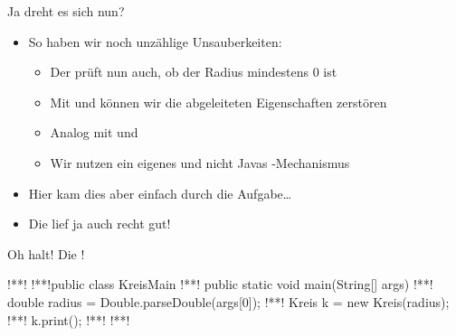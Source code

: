\iffull
\begin{frame}{Ja dreht es sich nun?}
    \begin{itemize}[<+(1)->]
        \itemsep6pt
        \item So haben wir noch unzählige Unsauberkeiten: \begin{itemize}
            \item Der  prüft nun auch, ob der Radius mindestens \(0\) ist 
            \item Mit  und  können wir die abgeleiteten Eigenschaften zerstören
            \item Analog mit  und 
            \item Wir nutzen ein eigenes  und nicht Javas -Mechanismus
        \end{itemize}
        \item Hier kam dies aber einfach durch die Aufgabe\ldots
        \item Die lief ja auch recht gut!
    \end{itemize}
\end{frame}
\fi

\begin{frame}[fragile,c]{Oh halt! Die !}
\begin{plainjava}
!**!
!**!public class KreisMain {
!**!   public static void main(String[] args) {
!**!       double radius = Double.parseDouble(args[0]);
!**!       Kreis k = new Kreis(radius);
!**!       k.print();
!**!   }
!**!}
\end{plainjava}
\end{frame}

